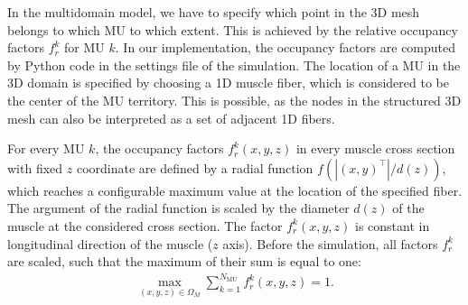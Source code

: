 In the multidomain model, we have to specify which point in the 3D mesh belongs to which MU to which extent. This is achieved by the relative occupancy factors $f_r^{k}$ for MU $k$.
In our implementation, the occupancy factors are computed by Python code in the settings file of the simulation.
The location of a MU in the 3D domain is specified by choosing a 1D muscle fiber, which is considered to be the center of the MU territory. This is possible, as the nodes in the structured 3D mesh can also be interpreted as a set of adjacent 1D fibers.

For every MU $k$, the occupancy factors $f_r^k(x,y,z)$ in every muscle cross section with fixed $z$ coordinate are defined by a radial function $f(|(x,y)^\top|/d(z))$, which reaches a configurable maximum value at the location of the specified fiber. The argument of the radial function is scaled by the diameter $d(z)$ of the muscle at the considered cross section. The factor $f_r^k(x,y,z)$ is constant in longitudinal direction of the muscle ($z$ axis). Before the simulation, all factors $f_r^k$ are scaled, such that the maximum of their sum is equal to one:%
\begin{align*}
  \max\limits_{(x,y,z)\in\Omega_M} \sum_{k=1}^{N_\text{MU}} f_r^k(x,y,z) = 1.
\end{align*}

